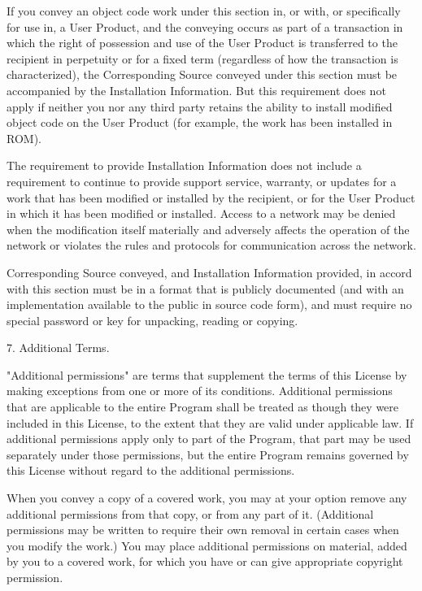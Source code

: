 \documentclass[parskip=half]{scrartcl}
\begin{document}
  If you convey an object code work under this section in, or with, or
specifically for use in, a User Product, and the conveying occurs as
part of a transaction in which the right of possession and use of the
User Product is transferred to the recipient in perpetuity or for a
fixed term (regardless of how the transaction is characterized), the
Corresponding Source conveyed under this section must be accompanied
by the Installation Information.  But this requirement does not apply
if neither you nor any third party retains the ability to install
modified object code on the User Product (for example, the work has
been installed in ROM).

  The requirement to provide Installation Information does not include a
requirement to continue to provide support service, warranty, or updates
for a work that has been modified or installed by the recipient, or for
the User Product in which it has been modified or installed.  Access to a
network may be denied when the modification itself materially and
adversely affects the operation of the network or violates the rules and
protocols for communication across the network.

  Corresponding Source conveyed, and Installation Information provided,
in accord with this section must be in a format that is publicly
documented (and with an implementation available to the public in
source code form), and must require no special password or key for
unpacking, reading or copying.

  7. Additional Terms.

  "Additional permissions" are terms that supplement the terms of this
License by making exceptions from one or more of its conditions.
Additional permissions that are applicable to the entire Program shall
be treated as though they were included in this License, to the extent
that they are valid under applicable law.  If additional permissions
apply only to part of the Program, that part may be used separately
under those permissions, but the entire Program remains governed by
this License without regard to the additional permissions.

  When you convey a copy of a covered work, you may at your option
remove any additional permissions from that copy, or from any part of
it.  (Additional permissions may be written to require their own
removal in certain cases when you modify the work.)  You may place
additional permissions on material, added by you to a covered work,
for which you have or can give appropriate copyright permission.
\end{document}

